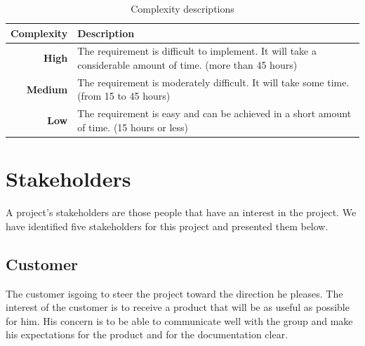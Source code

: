\begin{table}[H]
\begin{center}
\begin{tabular}{ | r | p{11.5cm} | }
  \hline
  \textbf{Complexity} & \textbf{Description} \\
  \hline\noalign{\smallskip}\noalign{\smallskip}\hline
  \textbf{High} & The requirement is difficult to implement.\newline
  It will take a considerable amount of time. (more than 45 hours) \\
  \textbf{Medium} & The requirement is moderately difficult.\newline
  It will take some time. (from 15 to 45 hours) \\
  \textbf{Low} & The requirement is easy and can be achieved\newline
  in a short amount of time. (15 hours or less) \\
  \hline
\end{tabular}
\end{center}
\caption{Complexity descriptions}
\label{table:complexity}
\end{table}



\section{Stakeholders}
\label{section:stakeholders}
A project's stakeholders are those people that have an interest in the project.
We have identified five stakeholders for this project and presented them below.

\subsection{Customer}
The customer isgoing to steer the project toward the direction he pleases.
The interest of the customer is to receive a product that will be as useful as possible for him.
His concern is to be able to communicate well with the group and make his expectations for the product
and for the documentation clear.

